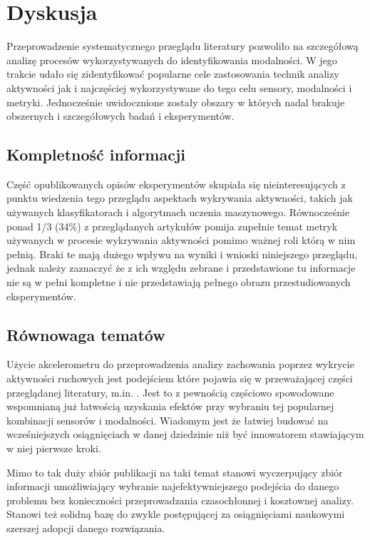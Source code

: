 \pagebreak
\section{Dyskusja}
Przeprowadzenie systematycznego przeglądu literatury pozwoliło na szczegółową analizę procesów wykorzystywanych do identyfikowania modalności. W jego trakcie udało się zidentyfikować popularne cele zastosowania technik analizy aktywności jak i najczęściej wykorzystywane do tego celu sensory, modalności i metryki. Jednocześnie uwidocznione zostały obszary w których nadal brakuje obszernych i szczegółowych badań i eksperymentów.

\subsection{Kompletność informacji}
Część opublikowanych opisów eksperymentów skupiała się nieinteresujących z punktu wiedzenia tego przeglądu aspektach wykrywania aktywności, takich jak używanych klasyfikatorach i algorytmach uczenia maszynowego. Równocześnie ponad 1/3 (34\%) z przeglądanych artykułów pomija zupełnie temat metryk używanych w procesie wykrywania aktywności pomimo ważnej roli którą w nim pełnią. Braki te mają dużego wpływu na wyniki i wnioski niniejszego przeglądu, jednak należy zaznaczyć że z ich względu zebrane i przedstawione tu informacje nie są w pełni kompletne i nie przedstawiają pełnego obrazu przestudiowanych eksperymentów. 

\subsection{Równowaga tematów}
\label{sec:article_balance}
Użycie akcelerometru do przeprowadzenia analizy zachowania poprzez wykrycie aktywności ruchowych jest podejściem które pojawia się w przeważającej części przeglądanej literatury, m.in. \cite{59_Air_Pressure_HAR, 33_Inertial_Study, 29_Daily_Sport_HAR, 30_Context_Awareness, 32_Accel_Phone_HAR, 42_Micro_AR}. Jest to z pewnością częściowo spowodowane wspomnianą już łatwością uzyskania efektów przy wybraniu tej popularnej kombinacji sensorów i modalności. Wiadomym jest że łatwiej budować na wcześniejszych osiągnięciach w danej dziedzinie niż być innowatorem stawiającym w niej pierwsze kroki. 

Mimo to tak duży zbiór publikacji na taki temat stanowi wyczerpujący zbiór informacji umożliwiający wybranie najefektywniejszego podejścia do danego problemu bez konieczności przeprowadzania czasochłonnej i kosztownej analizy. Stanowi też solidną bazę do zwykle postępującej za osiągnięciami naukowymi szerszej adopcji danego rozwiązania.

